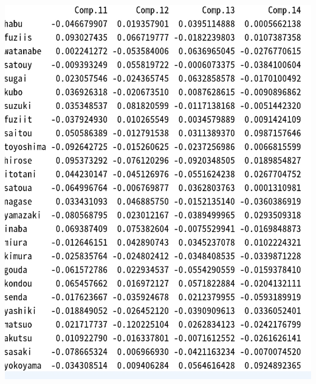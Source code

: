 \documentclass[11pt,a4paper,dvipdfmx]{jsarticle}
\begin{document}
\begin{minipage}[t]{0.47\hsize}
    \includegraphics[width=1\textwidth]{graph/shogi-scores-3.jpg}
\end{minipage}
\end{document}
